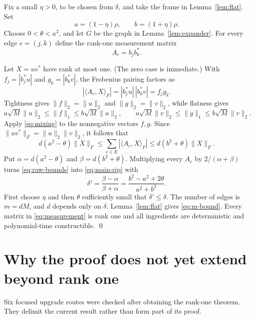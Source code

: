 \documentclass[11pt]{article}
\newcommand{\ip}[2]{\langle #1,#2\rangle}
\begin{document}
Fix a small $\eta>0$, to be chosen from $\delta$, and take the frame in
Lemma~\ref{lem:flat}.  Set
\[
 a=(1-\eta)\rho,\qquad b=(1+\eta)\rho.
\]
Choose $0<\theta<a^2$, and let $G$ be the graph in
Lemma~\ref{lem:expander}.  For every edge $e=(j,k)$ define the rank-one
measurement matrix
\begin{equation}\label{eq:measurement}
 A_e=b_jb_k^*.
\end{equation}

Let $X=uv^*$ have rank at most one.  (The zero case is immediate.)  With
$f_j=|b_j^*u|$ and $g_k=|b_k^*v|$, the Frobenius pairing factors as
\begin{equation}\label{eq:factor}
 |\ip{A_e}{X}_F|=|b_j^*u|\,|b_k^*v|=f_jg_k.
\end{equation}
Tightness gives $\|f\|_2=\|u\|_2$ and $\|g\|_2=\|v\|_2$, while flatness
gives
\[
 a\sqrt M\|u\|_2\leq\|f\|_1\leq b\sqrt M\|u\|_2,
 \qquad
 a\sqrt M\|v\|_2\leq\|g\|_1\leq b\sqrt M\|v\|_2.
\]
Apply \eqref{eq:mixing} to the nonnegative vectors $f,g$.  Since
$\|uv^*\|_F=\|u\|_2\|v\|_2$, it follows that
\begin{equation}\label{eq:raw-bounds}
 d(a^2-\theta)\|X\|_F
 \leq \sum_{e\in E}|\ip{A_e}{X}_F|
 \leq d(b^2+\theta)\|X\|_F.
\end{equation}
Put $\alpha=d(a^2-\theta)$ and $\beta=d(b^2+\theta)$.  Multiplying every
$A_e$ by $2/(\alpha+\beta)$ turns \eqref{eq:raw-bounds} into
\eqref{eq:main-rip} with
\begin{equation}\label{eq:delta-prime}
 \delta'=\frac{\beta-\alpha}{\beta+\alpha}
 =\frac{b^2-a^2+2\theta}{a^2+b^2}.
\end{equation}
First choose $\eta$ and then $\theta$ sufficiently small that
$\delta'\leq\delta$.  The number of edges is
$m=dM$, and $d$ depends only on $\delta$.  Lemma~\ref{lem:flat} gives
\eqref{eq:m-bound}.  Every matrix in \eqref{eq:measurement} is rank one and
all ingredients are deterministic and polynomial-time constructible.
\qed

\section{Why the proof does not yet extend beyond rank one}

Six focused upgrade routes were checked after obtaining the rank-one theorem.
They delimit the current result rather than form part of its proof.
\end{document}
